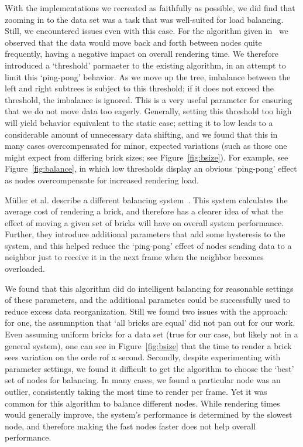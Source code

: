 With the implementations we recreated as faithfully as possible, we did
find that zooming in to the data set was a task that was well-suited
for load balancing.  Still, we encountered issues even with this case.
For the
algorithm given in~\cite{Marchesin:2006:DynamicLB} we observed that the
data would move back and forth between nodes quite frequently, having
a negative impact on overall rendering time.  We therefore introduced
a `threshold' parmaeter to the existing algorithm, in an attempt to
limit this `ping-pong' behavior.  As we move up the tree, imbalance
between the left and right subtrees is subject to this threshold; if
it does not exceed the threshold, the imbalance is ignored.  This
is a very useful parameter for ensuring that we do not move data
too eagerly.  Generally, setting this threshold too high will yield
behavior equivalent to the static case; setting it to low leads to a
considerable amount of unnecessary data shifting, and we found that
this in many cases overcompensated for minor, expected variations (such
as those one might expect
from differing brick sizes; see Figure~\ref{fig:bsize}).  For example,
see
Figure~\ref{fig:balance}, in which low thresholds display an obvious
`ping-pong' effect as nodes overcompensate for increased rendering
load.

M\"uller et al. describe a different balancing
system~\cite{Mueller:2006:ParallelVRen}.  This system calculates the
average cost of rendering a brick, and therefore has a clearer idea of
what the effect of moving a given set of bricks will have on overall
system performance.  Further, they introduce additional parameters
that add some hysteresis to the system, and this helped reduce the
`ping-pong' effect of nodes sending data to a neighbor just to receive
it in the next frame when the neighbor becomes overloaded.

We found that this algorithm did do intelligent balancing for
reasonable settings of these parameters, and the additional parametes
could be successfully used to reduce excess data reorganization.  Still
we found two issues with the approach: for one, the assumnption that
`all bricks are equal' did not pan out for our work.  Even assuming
uniform bricks for a data set (true for our case, but likely not in a
general system), one can see in
Figure~\ref{fig:bsize} that the time to render a brick sees variation
on the orde rof a second.  Secondly, despite experimenting with
parameter settings, we found it difficult to get the algorithm to
choose the `best' set of nodes for balancing.  In many cases, we found
a particular node was an outlier, consistently taking the most time
to render per frame.  Yet it was common for this algorithm to balance
different nodes.  While rendering times would generally improve, the
system's performance is determined by the slowest node, and therefore
making the fast nodes faster does not help overall performance.

